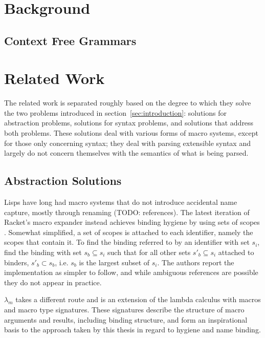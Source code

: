 \documentclass{kththesis}
\begin{document}
\chapter{Background}

\section{Context Free Grammars}

\chapter{Related Work}

The related work is separated roughly based on the degree to which they solve the two problems introduced in section~\ref{sec:introduction}: solutions for abstraction problems, solutions for syntax problems, and solutions that address both problems. These solutions deal with various forms of macro systems, except for those only concerning syntax; they deal with parsing extensible syntax and largely do not concern themselves with the semantics of what is being parsed.

\section{Abstraction Solutions} \label{sec:abstraction-solutions}

Lisps have long had macro systems that do not introduce accidental name capture, mostly through renaming (TODO: references). The latest iteration of Racket's \cite{Flatt2010Reference:-Rack} macro expander instead achieves binding hygiene by using sets of scopes \cite{Flatt2016Binding-As-Sets}. Somewhat simplified, a set of scopes is attached to each identifier, namely the scopes that contain it. To find the binding referred to by an identifier with set $s_i$, find the binding with set $s_b \subseteq s_i$ such that for all other sets $s'_b \subseteq s_i$ attached to binders, $s'_b \subset s_b$, i.e. $s_b$ is the largest subset of $s_i$. The authors report the implementation as simpler to follow, and while ambiguous references are possible they do not appear in practice.

$\lambda_m$ \cite{Herman2010A-Theory-of-Typ} takes a different route and is an extension of the lambda calculus with macros and macro type signatures. These signatures describe the structure of macro arguments and results, including binding structure, and form an inspirational basis to the approach taken by this thesis in regard to hygiene and name binding.
\end{document}
